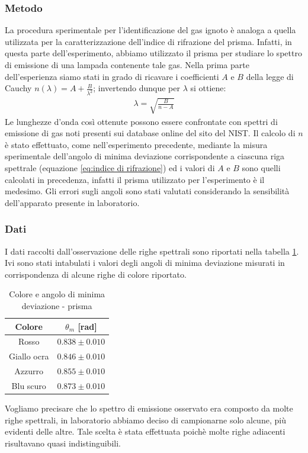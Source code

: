 \documentclass[a4paper]{article}
\begin{document}
\subsubsection{Metodo} 
La procedura sperimentale per l'identificazione del gas ignoto è analoga a quella utilizzata per la caratterizzazione dell'indice di rifrazione del prisma. Infatti, in questa parte dell'esperimento, abbiamo utilizzato il prisma per studiare lo spettro di emissione di una lampada contenente tale gas. Nella prima parte dell'esperienza siamo stati in grado di ricavare i coefficienti $A$ e $B$ della legge di Cauchy $n(\lambda)=A+\frac{B}{\lambda^2}$; invertendo dunque per $\lambda$ si ottiene:
\begin{align}
    \lambda=\sqrt{\frac{B}{n-A}}
\label{eq:lambda_gas_ignoto_prisma}
\end{align}
Le lunghezze d'onda così ottenute possono essere confrontate con spettri di emissione di gas noti presenti sui database online del sito del NIST.
Il calcolo di $n$ è stato effettuato, come nell'esperimento precedente, mediante la misura sperimentale dell'angolo di minima deviazione corrispondente a ciascuna riga spettrale (equazione \ref{eq:indice di rifrazione}) ed i valori di $A$ e $B$ sono quelli calcolati in precedenza, infatti il prisma utilizzato per l'esperimento è il medesimo.
Gli errori sugli angoli sono stati valutati considerando la sensibilità dell'apparato presente in laboratorio.

\subsubsection{Dati}
I dati raccolti dall'osservazione delle righe spettrali sono riportati nella tabella \ref{tab:angoli_gas_ignoto_prisma}. Ivi sono stati intabulati i valori degli angoli di minima deviazione misurati in corrispondenza di alcune righe di colore riportato. 
\begin{table}[htbp]
\centering
\begin{tabular}{|c|c|}
\hline
\textbf{Colore} & \textbf{$\theta_m$ [rad]} \\
\hline
Rosso   & $0.838 \pm 0.010$\\
Giallo ocra & $0.846 \pm 0.010$\\
Azzurro          & $0.855 \pm 0.010$\\
Blu scuro        & $0.873 \pm 0.010$\\
\hline
\end{tabular}
\caption{Colore e angolo di minima deviazione - prisma}
\label{tab:angoli_gas_ignoto_prisma}
\end{table}
Vogliamo precisare che lo spettro di emissione osservato era composto da molte righe spettrali, in laboratorio abbiamo deciso di campionarne solo alcune, più evidenti delle altre. Tale scelta è stata effettuata poichè molte righe adiacenti risultavano quasi indistinguibili.   
\end{document}
